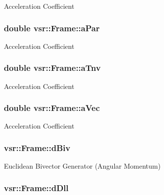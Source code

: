 Acceleration Coefficient \hypertarget{classvsr_1_1_frame_a9ee8067c502dacd6d134081cbf0585f1}{
\subsubsection[{a\-Par}]{\setlength{\rightskip}{0pt plus 5cm}double {\bf vsr\-::\-Frame\-::a\-Par}}}\label{classvsr_1_1_frame_a9ee8067c502dacd6d134081cbf0585f1}
Acceleration Coefficient \hypertarget{classvsr_1_1_frame_a95e70c04818aac6e1c01109f6d8c29a9}{
\subsubsection[{a\-Tnv}]{\setlength{\rightskip}{0pt plus 5cm}double {\bf vsr\-::\-Frame\-::a\-Tnv}}}\label{classvsr_1_1_frame_a95e70c04818aac6e1c01109f6d8c29a9}
Acceleration Coefficient \hypertarget{classvsr_1_1_frame_ac4f90219600fb31b03d157e6e60af411}{
\subsubsection[{a\-Vec}]{\setlength{\rightskip}{0pt plus 5cm}double {\bf vsr\-::\-Frame\-::a\-Vec}}}\label{classvsr_1_1_frame_ac4f90219600fb31b03d157e6e60af411}
Acceleration Coefficient \hypertarget{classvsr_1_1_frame_a9195adebb17ba0ad84ba7849850f1578}{
\subsubsection[{d\-Biv}]{ {\bf vsr\-::\-Frame\-::d\-Biv}}}\label{classvsr_1_1_frame_a9195adebb17ba0ad84ba7849850f1578}
Euclidean Bivector Generator (Angular Momentum) \hypertarget{classvsr_1_1_frame_ada205fc37ee27b1bd32e65f981560b20}{
\subsubsection[{d\-Dll}]{ {\bf vsr\-::\-Frame\-::d\-Dll}}}\label{classvsr_1_1_frame_ada205fc37ee27b1bd32e65f981560b20}
